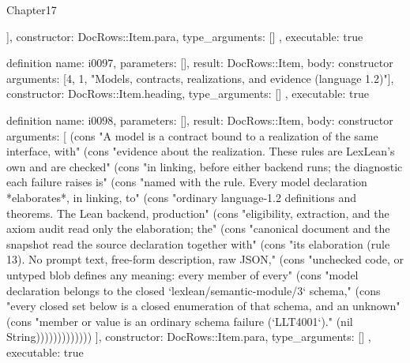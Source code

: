 \begin{lexlean}{Chapter17}
\begin{semanticmodule}
{{    ],
    constructor: DocRows::Item.para,
    type_arguments: []
  },
  executable: true
}

definition{
  name: i0097,
  parameters: [],
  result: DocRows::Item,
  body: constructor{
    arguments: [4, 1, "Models, contracts, realizations, and evidence (language 1.2)"],
    constructor: DocRows::Item.heading,
    type_arguments: []
  },
  executable: true
}

definition{
  name: i0098,
  parameters: [],
  result: DocRows::Item,
  body: constructor{
    arguments: [
      (cons "A model is a contract bound to a realization of the same interface, with" (cons "evidence about the realization. These rules are LexLean's own and are checked" (cons "in linking, before either backend runs; the diagnostic each failure raises is" (cons "named with the rule. Every model declaration *elaborates*, in linking, to" (cons "ordinary language-1.2 definitions and theorems. The Lean backend, production" (cons "eligibility, extraction, and the axiom audit read only the elaboration; the" (cons "canonical document and the snapshot read the source declaration together with" (cons "its elaboration (rule 13). No prompt text, free-form description, raw JSON," (cons "unchecked code, or untyped blob defines any meaning: every member of every" (cons "model declaration belongs to the closed `lexlean/semantic-module/3` schema," (cons "every closed set below is a closed enumeration of that schema, and an unknown" (cons "member or value is an ordinary schema failure (`LLT4001`)." (nil String)))))))))))))
    ],
    constructor: DocRows::Item.para,
    type_arguments: []
  },
  executable: true
}


\end{semanticmodule}
\end{lexlean}
